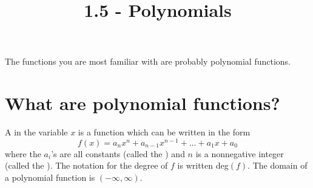 \documentclass{ximera}
\title{1.5 - Polynomials}
\begin{document}
\begin{abstract} \end{abstract}
\maketitle


The functions you are most familiar with are probably polynomial
functions.

\section{What are polynomial functions?}

\begin{definition}
  A  in the variable $x$ is a function
  which can be written in the form
  \[
  f(x) = a_nx^n + a_{n-1}x^{n-1} + \dots + a_1 x + a_0
  \]
  where the $a_i$'s are all constants (called the )
  and $n$ is a nonnegative integer (called the ). The notation for the degree of $f$ is written deg$(f)$. The domain of a polynomial function is $(-\infty,\infty)$.
\end{definition}
\end{document}
